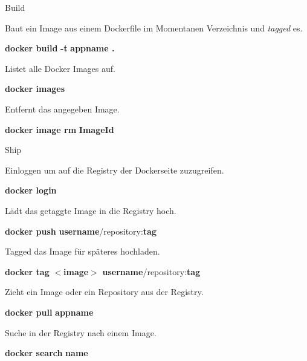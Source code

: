 \documentclass[final]{beamer}
\newlength{\specialcolwid}
\begin{document}
\begin{frame}
\begin{columns}[t]
\begin{column}{\specialcolwid}
\begin{block}{Build}

\par Baut ein Image aus einem Dockerfile im Momentanen Verzeichnis und \textit{tagged} es.

\par \textbf{docker build} \textcolor{docker-pu}{\textbf{-t}} \textcolor{docker-lb}{\textbf{appname .}}

\vspace{1cm}
\par Listet alle Docker Images auf.
\par \textbf{docker images}

\vspace{1cm}
\par Entfernt das angegeben Image.
\par \textbf{docker image rm} \textcolor{docker-lb}{\textbf{ImageId}}

\end{block}

\begin{block}{Ship}

\par Einloggen um auf die Registry der Dockerseite zuzugreifen.
\par \textbf{docker login}

\vspace{1cm}
\par Lädt das getaggte Image in die Registry hoch.
\par \textbf{docker push} \textcolor{docker-lb}{\textbf{username}}/repository:\textcolor{docker-lb}{\textbf{tag}}

\vspace{1cm}
\par Tagged das Image für späteres hochladen.
\par \textbf{docker tag } $<$\textcolor{docker-lb}{\textbf{image}}$>$ \textcolor{docker-lb}{\textbf{username}}/repository:\textcolor{docker-lb}{\textbf{tag}}

\vspace{1cm}
\par Zieht ein Image oder ein Repository aus der Registry.
\par \textbf{docker pull} \textcolor{docker-lb}{\textbf{appname}}

\vspace{1cm}
\par Suche in der Registry nach einem Image.
\par \textbf{docker search} \textcolor{docker-lb}{\textbf{name}}



\end{block}
\end{column}
\end{columns}
\end{frame}
\end{document}
